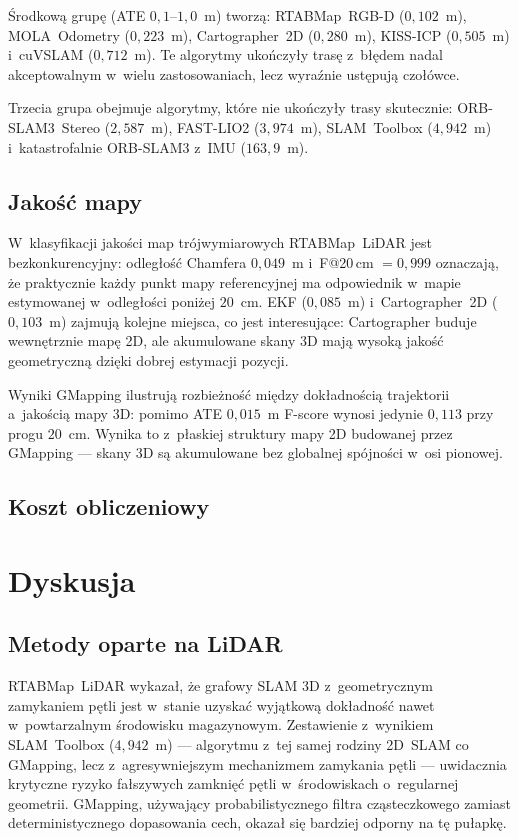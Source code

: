 Środkową grupę (ATE $0{,}1$--$1{,}0$~m) tworzą: RTABMap~RGB-D ($0{,}102$~m),
MOLA~Odometry ($0{,}223$~m), Cartographer~2D ($0{,}280$~m),
KISS-ICP ($0{,}505$~m) i~cuVSLAM ($0{,}712$~m).
Te algorytmy ukończyły trasę z~błędem nadal akceptowalnym w~wielu zastosowaniach,
lecz wyraźnie ustępują czołówce.

Trzecia grupa obejmuje algorytmy, które nie ukończyły trasy skutecznie:
ORB-SLAM3~Stereo ($2{,}587$~m), FAST-LIO2 ($3{,}974$~m),
SLAM~Toolbox ($4{,}942$~m) i~katastrofalnie ORB-SLAM3 z~IMU ($163{,}9$~m).

\subsection{Jakość mapy}

W~klasyfikacji jakości map trójwymiarowych RTABMap~LiDAR jest bezkonkurencyjny:
odległość Chamfera $0{,}049$~m i~F@20\,cm $= 0{,}999$ oznaczają, że praktycznie
każdy punkt mapy referencyjnej ma odpowiednik w~mapie estymowanej w~odległości
poniżej $20$~cm.
EKF ($0{,}085$~m) i~Cartographer~2D ($0{,}103$~m) zajmują kolejne miejsca,
co jest interesujące: Cartographer buduje wewnętrznie mapę 2D, ale akumulowane
skany 3D mają wysoką jakość geometryczną dzięki dobrej estymacji pozycji.

Wyniki GMapping ilustrują rozbieżność między dokładnością trajektorii
a~jakością mapy 3D: pomimo ATE $0{,}015$~m F-score wynosi jedynie $0{,}113$
przy progu $20$~cm.
Wynika to z~płaskiej struktury mapy 2D budowanej przez GMapping ---
skany 3D są akumulowane bez globalnej spójności w~osi pionowej.

\subsection{Koszt obliczeniowy}


\section{Dyskusja}

\subsection{Metody oparte na LiDAR}

RTABMap~LiDAR wykazał, że grafowy SLAM 3D z~geometrycznym zamykaniem pętli
jest w~stanie uzyskać wyjątkową dokładność nawet w~powtarzalnym środowisku
magazynowym.
Zestawienie z~wynikiem SLAM~Toolbox ($4{,}942$~m) --- algorytmu z~tej samej
rodziny 2D~SLAM co GMapping, lecz z~agresywniejszym mechanizmem zamykania pętli
--- uwidacznia krytyczne ryzyko fałszywych zamknięć pętli w~środowiskach
o~regularnej geometrii.
GMapping, używający probabilistycznego filtra cząsteczkowego zamiast
deterministycznego dopasowania cech, okazał się bardziej odporny na tę pułapkę.


